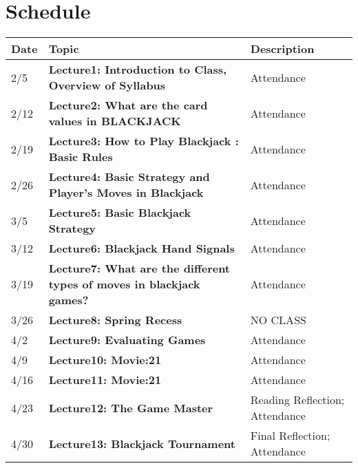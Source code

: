 
 \section{Schedule}
\begin{tabular}{ |p{2cm}| p{9.5cm}| p{5cm}|}
\hline
\bf Date & \bf Topic & \bf Description\\
\hline
2/5 & \bf Lecture1: Introduction to Class, Overview of Syllabus & Attendance\\
\hline
2/12 &\bf Lecture2: What are the card values in BLACKJACK & Attendance\\
\hline 
2/19 & \bf Lecture3: How to Play Blackjack : Basic Rules & Attendance\\
\hline 
2/26 & \bf Lecture4: Basic Strategy and Player’s Moves in Blackjack & Attendance\\
\hline 
3/5  & \bf Lecture5: Basic Blackjack Strategy & Attendance\\
\hline 
3/12  & \bf Lecture6: Blackjack Hand Signals & Attendance\\
\hline
3/19  & \bf Lecture7: What are the different types of moves in blackjack games? & Attendance\\
\hline
3/26  & \bf Lecture8: Spring Recess & NO CLASS \\
\hline
4/2  & \bf Lecture9: Evaluating Games & Attendance\\
\hline
4/9  & \bf Lecture10: Movie:21 & Attendance\\
\hline
4/16  & \bf Lecture11: Movie:21  & Attendance\\
\hline
4/23  & \bf Lecture12: The Game Master & Reading Reflection; Attendance\\
\hline
4/30  & \bf Lecture13: Blackjack Tournament & Final Reflection; Attendance\\
\hline

\end{tabular}
  

